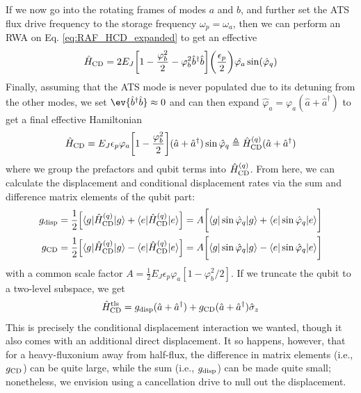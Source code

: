 If we now go into the rotating frames of modes $a$ and $b$, and further set the ATS flux drive frequency to the storage frequency $\omega_p = \omega_a$, then we can perform an RWA on Eq. \eqref{eq:RAF_HCD_expanded} to get an effective
\begin{equation}
    \hat{H}_{\rm CD} = 2E_J \bigg[1 - \frac{\varphi_b^2}{2} - \varphi_b^2\hat{b}^\dagger\hat{b}\bigg]\bigg(\frac{\epsilon_p}{2}\bigg)\hat{\varphi_a}\sin(\hat{\varphi}_q)
\end{equation}
Finally, assuming that the ATS mode is never populated due to its detuning from the other modes, we set $\ev{\hat{b}^\dagger\hat{b}} \approx 0$ and can then expand $\hat{\varphi}_a = \varphi_a(\hat{a} + \hat{a}^\dagger)$ to get a final effective Hamiltonian
\begin{equation}
    \hat{H}_{\rm CD} = E_J  \epsilon_p\varphi_a \bigg[1 - \frac{\varphi_b^2}{2} \bigg](\hat{a} + \hat{a}^\dagger)\sin\hat{\varphi}_q \triangleq \hat{H}_{\rm CD}^{(q)} (\hat{a} + \hat{a}^\dagger)
\end{equation}
where we group the prefactors and qubit terms into $\hat{H}_{\rm CD}^{(q)}$. From here, we can calculate the displacement and conditional displacement rates via the sum and difference matrix elements of the qubit part:
\begin{align}
    \begin{split}
        g_\mathrm{disp} &= \frac{1}{2}\Big[\langle g|\hat{H}_{\rm CD}^{(q)}|g\rangle + \langle e|\hat{H}_{\rm CD}^{(q)}|e\rangle \Big] = A\bigg[\langle g|\sin\hat{\varphi}_q|g\rangle + \langle e|\sin\hat{\varphi}_q|e\rangle\bigg] \\
        g_{\rm CD} &= \frac{1}{2}\Big[\langle g|\hat{H}_{\rm CD}^{(q)}|g\rangle - \langle e|\hat{H}_{\rm CD}^{(q)}|e\rangle \Big] = A\bigg[\langle g|\sin\hat{\varphi}_q|g\rangle - \langle e|\sin\hat{\varphi}_q|e\rangle\bigg]
    \end{split}
\end{align}
with a common scale factor $A = \frac{1}{2}E_J\epsilon_p   \varphi_a[1 - \varphi_b^2/2]$. If we truncate the qubit to a two-level subspace, we get
\begin{equation}
    \hat{H}_{\rm CD}^{\rm tls} = g_{\rm disp} (\hat{a}+\hat{a}^\dagger) + g_{\rm CD} (\hat{a}+\hat{a}^\dagger)\hat{\sigma}_z
\end{equation}
This is precisely the conditional displacement interaction we wanted, though it also comes with an additional direct displacement. It so happens, however, that for a heavy-fluxonium away from half-flux, the difference in matrix elements (i.e., $g_{\rm CD}$) can be quite large, while the sum (i.e., $g_{\rm disp}$) can be made quite small; nonetheless, we envision using a cancellation drive to null out the displacement. 

